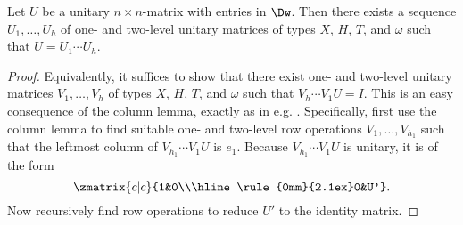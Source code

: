 \begin{lemma}\label{lem-matrix-decomposition}
  Let $U$ be a unitary $n\times n$-matrix with entries in $\Dw$. Then there exists a sequence
  $U_1,\ldots,U_h$ of one- and two-level unitary matrices of types $X$, $H$, $T$, and $\omega$ such
  that $U=U_1\cdots U_h$.
\end{lemma}

\begin{proof}
  Equivalently, it suffices to show that there exist one- and two-level unitary matrices
  $V_1,\ldots,V_h$ of types $X$, $H$, $T$, and $\omega$ such that $V_h\cdots V_1U=I$. This is an
  easy consequence of the column lemma, exactly as in e.g. {\cite[Sec.~4.5.1]{neilsen2000:QuantumComputationAndInfo}}.
  Specifically, first use the column lemma to find suitable one- and two-level row operations
  $V_1,\ldots,V_{h_1}$ such that the leftmost column of $V_{h_1}\cdots V_1 U$ is $e_1$. Because
  $V_{h_1}\cdots V_1 U$ is unitary, it is of the form
  \[
    \zmatrix{c|c}{1&0\\\hline \rule{0mm}{2.1ex}0&U'}.
  \]
  Now recursively find row operations to reduce $U'$ to the identity matrix.
\end{proof}

